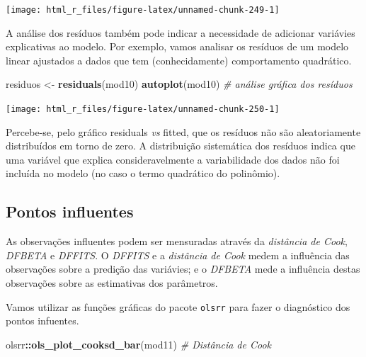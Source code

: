 \documentclass[
]{book}
\newenvironment{Shaded}{\begin{snugshade}}{\end{snugshade}}
\newcommand{\CommentTok}[1]{\textcolor[rgb]{0.56,0.35,0.01}{\textit{#1}}}
\newcommand{\KeywordTok}[1]{\textcolor[rgb]{0.13,0.29,0.53}{\textbf{#1}}}
\newcommand{\NormalTok}[1]{#1}
\newcommand{\OperatorTok}[1]{\textcolor[rgb]{0.81,0.36,0.00}{\textbf{#1}}}
\newcommand{\StringTok}[1]{\textcolor[rgb]{0.31,0.60,0.02}{#1}}
\begin{document}
\begin{center}\texttt{[image: html\_r\_files/figure-latex/unnamed-chunk-249-1]} \end{center}

A análise dos resíduos  também pode indicar a necessidade de adicionar variávies explicativas ao modelo. Por exemplo, vamos analisar os resíduos de um modelo linear ajustados a dados que tem (conhecidamente) comportamento quadrático.

\begin{Shaded}
\begin{Highlighting}[]
\NormalTok{residuos <-}\StringTok{ }\KeywordTok{residuals}\NormalTok{(mod10)}
\KeywordTok{autoplot}\NormalTok{(mod10) }\CommentTok{# análise gráfica dos resíduos}
\end{Highlighting}
\end{Shaded}

\begin{center}\texttt{[image: html\_r\_files/figure-latex/unnamed-chunk-250-1]} \end{center}

Percebe-se, pelo gráfico residuals \emph{vs} fitted, que os resíduos não são aleatoriamente distribuídos em torno de zero. A distribuição sistemática dos resíduos indica que uma variável que explica consideravelmente a variabilidade dos dados não foi incluída no modelo (no caso o termo quadrático do polinômio).

\hypertarget{pontos-influentes}{%
\subsection{Pontos influentes}\label{pontos-influentes}}


As observações influentes podem ser mensuradas através da \emph{distância de Cook}, \emph{DFBETA} e \emph{DFFITS}. O \emph{DFFITS} e a \emph{distância de Cook} medem a influência das observações sobre a predição das variávies; e o \emph{DFBETA} mede a influência destas observações sobre as estimativas dos parâmetros.

Vamos utilizar as funções gráficas do pacote \texttt{olsrr} para fazer o diagnóstico dos pontos infuentes.

\begin{Shaded}
\begin{Highlighting}[]
\NormalTok{olsrr}\OperatorTok{::}\KeywordTok{ols_plot_cooksd_bar}\NormalTok{(mod11) }\CommentTok{# Distância de Cook}
\end{Highlighting}
\end{Shaded}
\end{document}
